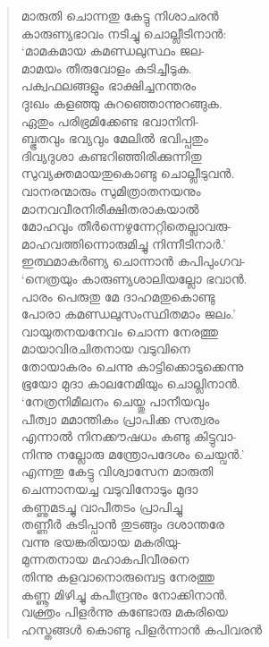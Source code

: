\begin{verse}
മാരുതി ചൊന്നതു കേട്ടു നിശാചരന്‍\\
കാരുണ്യഭാവം നടിച്ചു ചൊല്ലീടിനാന്‍:\\
‘മാമകമായ കമണ്ഡലുസ്ഥം ജല-\\
മാമയം തീരുവോളം കുടിച്ചീടുക.\\
പക്വഫലങ്ങളും ഭാക്ഷിച്ചനന്തരം\\
ദുഃഖം കളഞ്ഞു കുറഞ്ഞൊന്നുറങ്ങുക.\\
ഏതും പരിഭ്രമിക്കേണ്ട ഭവാനിനി-\\
ബ്ഭൂതവും ഭവ്യവും മേലില്‍ ഭവിപ്പതും\\
ദിവ്യദുശാ കണ്ടറിഞ്ഞിരിക്കുന്നിതു\\
സുവ്യക്തമായതുകൊണ്ടു ചൊല്ലീടുവന്‍.\\
വാനരന്മാരും സുമിത്രാതനയനും\\
മാനവവീരനിരീക്ഷിതരാകയാല്‍\\
മോഹവും തീര്‍ന്നെഴുന്നേറ്റിതെല്ലാവരു-\\
മാഹവത്തിന്നൊരുമിച്ചു നിന്നീടിനാര്‍.’\\
ഇത്ഥമാകര്‍ണ്യ ചൊന്നാന്‍ കപിപുംഗവ-\\
‘നെത്രയും കാരുണ്യശാലിയല്ലോ ഭവാന്‍.\\
പാരം പെരുതു മേ ദാഹമതുകൊണ്ടു\\
പോരാ കമണ്ഡലുസംസ്ഥിതമാം ജലം.’\\
വായുതനയനേവം ചൊന്ന നേരത്തു\\
മായാവിരചിതനായ വടുവിനെ\\
തോയാകരം ചെന്നു കാട്ടിക്കൊടുക്കെന്നു\\
ഭൂയോ മുദാ കാലനേമിയും ചൊല്ലിനാന്‍.\\
‘നേത്രനിമീലനം ചെയ്തു പാനീയവും\\
പീത്വാ മമാന്തികം പ്രാപിക്ക സത്വരം\\
എന്നാല്‍ നിനക്കൗഷധം കണ്ടു കിട്ടുവാ-\\
നിന്നു നല്ലോരു മന്ത്രോപദേശം ചെയ്വന്‍.’\\
എന്നതു കേട്ടു വിശ്വാസേന മാരുതി\\
ചെന്നാനയച്ച വടുവിനോടും മുദാ\\
കണ്ണുമടച്ചു വാപീതടം പ്രാപിച്ചു\\
തണ്ണീര്‍ കുടിപ്പാന്‍ തുടങ്ങും ദശാന്തരേ\\
വന്നു ഭയങ്കരിയായ മകരിയു-\\
മുന്നതനായ മഹാകപിവീരനെ\\
തിന്നു കളവാനൊരുമ്പെട്ട നേരത്തു\\
കണ്ണൂ മിഴിച്ചു കപീന്ദ്രനും നോക്കിനാന്‍.\\
വക്ത്രം പിളര്‍ന്നു കണ്ടോരു മകരിയെ\\
ഹസ്തങ്ങള്‍ കൊണ്ടു പിളര്‍ന്നാന്‍ കപിവരന്‍\\

\end{verse}
